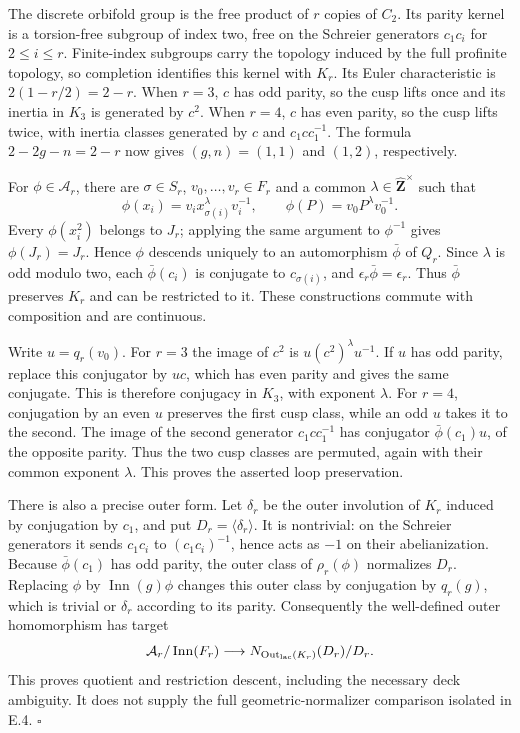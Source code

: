 \documentclass[10pt,a4paper]{article}
\begin{document}
The discrete orbifold group is the free product of \(r\) copies of \(C_2\). Its parity kernel is a torsion-free subgroup of index two, free on the Schreier generators \(c_1c_i\) for \(2\leq i\leq r\). Finite-index subgroups carry the topology induced by the full profinite topology, so completion identifies this kernel with \(K_r\). Its Euler characteristic is \(2(1-r/2)=2-r\). When \(r=3\), \(c\) has odd parity, so the cusp lifts once and its inertia in \(K_3\) is generated by \(c^2\). When \(r=4\), \(c\) has even parity, so the cusp lifts twice, with inertia classes generated by \(c\) and \(c_1cc_1^{-1}\). The formula \(2-2g-n=2-r\) now gives \((g,n)=(1,1)\) and \((1,2)\), respectively.

For \(\phi\in\mathcal A_r\), there are \(\sigma\in S_r\), \(v_0,\ldots,v_r\in F_r\) and a common \(\lambda\in\widehat{\mathbf Z}^{\times}\) such that \[
 \phi(x_i)=v_i x_{\sigma(i)}^{\lambda}v_i^{-1},\qquad
 \phi(P)=v_0P^{\lambda}v_0^{-1}.
\] Every \(\phi(x_i^2)\) belongs to \(J_r\); applying the same argument to \(\phi^{-1}\) gives \(\phi(J_r)=J_r\). Hence \(\phi\) descends uniquely to an automorphism \(\bar\phi\) of \(Q_r\). Since \(\lambda\) is odd modulo two, each \(\bar\phi(c_i)\) is conjugate to \(c_{\sigma(i)}\), and \(\epsilon_r\bar\phi=\epsilon_r\). Thus \(\bar\phi\) preserves \(K_r\) and can be restricted to it. These constructions commute with composition and are continuous.

Write \(u=q_r(v_0)\). For \(r=3\) the image of \(c^2\) is \(u(c^2)^{\lambda}u^{-1}\). If \(u\) has odd parity, replace this conjugator by \(uc\), which has even parity and gives the same conjugate. This is therefore conjugacy in \(K_3\), with exponent \(\lambda\). For \(r=4\), conjugation by an even \(u\) preserves the first cusp class, while an odd \(u\) takes it to the second. The image of the second generator \(c_1cc_1^{-1}\) has conjugator \(\bar\phi(c_1)u\), of the opposite parity. Thus the two cusp classes are permuted, again with their common exponent \(\lambda\). This proves the asserted loop preservation.

There is also a precise outer form. Let \(\delta_r\) be the outer involution of \(K_r\) induced by conjugation by \(c_1\), and put \(D_r=\langle\delta_r\rangle\). It is nontrivial: on the Schreier generators it sends \(c_1c_i\) to \((c_1c_i)^{-1}\), hence acts as \(-1\) on their abelianization. Because \(\bar\phi(c_1)\) has odd parity, the outer class of \(\rho_r(\phi)\) normalizes \(D_r\). Replacing \(\phi\) by \(\operatorname{Inn}(g)\phi\) changes this outer class by conjugation by \(q_r(g)\), which is trivial or \(\delta_r\) according to its parity. Consequently the well-defined outer homomorphism has target \[
 \mathcal A_r/\operatorname{Inn}(F_r)
 \longrightarrow
 N_{\operatorname{Out}_{\rm lac}(K_r)}(D_r)/D_r.
\] This proves quotient and restriction descent, including the necessary deck ambiguity. It does not supply the full geometric-normalizer comparison isolated in E.4. \(\square\)
\end{document}
